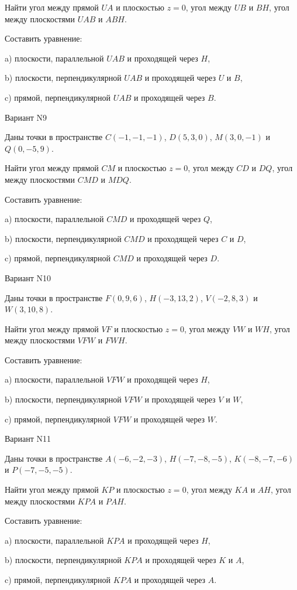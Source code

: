 \documentclass[11pt]{report}
\begin{document}
Найти угол между прямой $UA$ и плоскостью $z = 0$, угол между $UB$ и $BH$, угол между плоскостями $UAB$ 
и $ABH$.

Составить уравнение: 

a) плоскости, параллельной $UAB$ и проходящей через $H$,

b) плоскости, перпендикулярной $UAB$ и проходящей через $U$ и $B$,

c) прямой, перпендикулярной $UAB$ и проходящей через $B$.

Вариант N9

Даны точки в пространстве
$C(-1, -1, -1)$, $D(5, 3, 0)$, $M(3, 0, -1)$ и
$Q(0, -5, 9)$.

Найти угол между прямой $CM$ и плоскостью $z = 0$, угол между $CD$ и $DQ$, угол между плоскостями $CMD$ 
и $MDQ$.

Составить уравнение: 

a) плоскости, параллельной $CMD$ и проходящей через $Q$,

b) плоскости, перпендикулярной $CMD$ и проходящей через $C$ и $D$,

c) прямой, перпендикулярной $CMD$ и проходящей через $D$.

Вариант N10

Даны точки в пространстве
$F(0, 9, 6)$, $H(-3, 13, 2)$, $V(-2, 8, 3)$ и
$W(3, 10, 8)$.

Найти угол между прямой $VF$ и плоскостью $z = 0$, угол между $VW$ и $WH$, угол между плоскостями $VFW$ 
и $FWH$.

Составить уравнение: 

a) плоскости, параллельной $VFW$ и проходящей через $H$,

b) плоскости, перпендикулярной $VFW$ и проходящей через $V$ и $W$,

c) прямой, перпендикулярной $VFW$ и проходящей через $W$.

Вариант N11

Даны точки в пространстве
$A(-6, -2, -3)$, $H(-7, -8, -5)$, $K(-8, -7, -6)$ и
$P(-7, -5, -5)$.

Найти угол между прямой $KP$ и плоскостью $z = 0$, угол между $KA$ и $AH$, угол между плоскостями $KPA$ 
и $PAH$.

Составить уравнение: 

a) плоскости, параллельной $KPA$ и проходящей через $H$,

b) плоскости, перпендикулярной $KPA$ и проходящей через $K$ и $A$,

c) прямой, перпендикулярной $KPA$ и проходящей через $A$.
\end{document}
